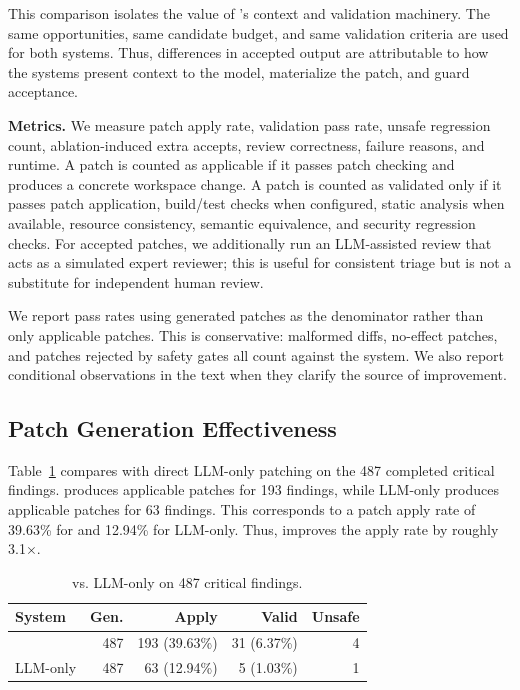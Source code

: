 This comparison isolates the value of \SysName{}'s context and validation
machinery. The same opportunities, same candidate budget, and same validation
criteria are used for both systems. Thus, differences in accepted output are
attributable to how the systems present context to the model, materialize the
patch, and guard acceptance.

\noindent\textbf{Metrics.}
We measure patch apply rate, validation pass rate, unsafe regression count,
ablation-induced extra accepts, review correctness, failure reasons, and
runtime. A patch is counted as applicable if it passes patch checking and
produces a concrete workspace change. A patch is counted as validated only if it
passes patch application, build/test checks when configured, static analysis
when available, resource consistency, semantic equivalence, and security
regression checks. For accepted patches, we additionally run an LLM-assisted
review that acts as a simulated expert reviewer; this is useful for consistent
triage but is not a substitute for independent human review.

We report pass rates using generated patches as the denominator rather than
only applicable patches. This is conservative: malformed diffs, no-effect
patches, and patches rejected by safety gates all count against the system. We
also report conditional observations in the text when they clarify the source
of improvement.

\subsection{Patch Generation Effectiveness}
\label{sec:evaluation-effectiveness}

Table~\ref{tab:eval-care-vs-llm} compares \SysName{} with direct LLM-only
patching on the 487 completed critical findings. \SysName{} produces applicable
patches for 193 findings, while LLM-only produces applicable patches for 63
findings. This corresponds to a patch apply rate of 39.63\% for \SysName{} and
12.94\% for LLM-only. Thus, \SysName{} improves the apply rate by roughly
3.1$\times$.

\begin{table}[t]
  \centering
  \caption{\SysName{} vs. LLM-only on 487 critical findings.}
  \label{tab:eval-care-vs-llm}
  \footnotesize
  \begin{tabular}{@{}lrrrr@{}}
    \toprule
    \textbf{System} & \textbf{Gen.} & \textbf{Apply} & \textbf{Valid} & \textbf{Unsafe} \\
    \midrule
    \SysName{} & 487 & 193 (39.63\%) & 31 (6.37\%) & 4 \\
    LLM-only & 487 & 63 (12.94\%) & 5 (1.03\%) & 1 \\
    \bottomrule
  \end{tabular}
\end{table}

